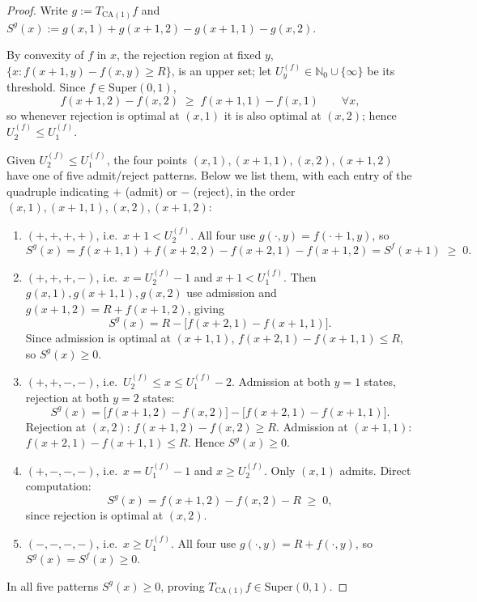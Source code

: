 \documentclass[11pt,a4paper]{article}
\newcommand{\N}{\mathbb{N}}
\newcommand{\Tca}{T_{\mathrm{CA}(1)}}
\theoremstyle{definition}
\begin{document}
\begin{proof}
Write $g := \Tca f$ and
$S^g(x) := g(x, 1) + g(x+1, 2) - g(x+1, 1) - g(x, 2)$.

By convexity of $f$ in $x$, the rejection region at fixed $y$,
$\{x : f(x+1, y) - f(x, y) \ge R\}$, is an upper set; let
$U_y^{(f)} \in \N_0 \cup \{\infty\}$ be its threshold. Since
$f \in \mathrm{Super}(0, 1)$,
\[
    f(x+1, 2) - f(x, 2) \;\ge\; f(x+1, 1) - f(x, 1) \qquad \forall x,
\]
so whenever rejection is optimal at $(x, 1)$ it is also optimal at
$(x, 2)$; hence $U_2^{(f)} \le U_1^{(f)}$.

Given $U_2^{(f)} \le U_1^{(f)}$, the four points
$(x, 1), (x+1, 1), (x, 2), (x+1, 2)$ have one of five
admit/reject patterns. Below we list them, with each entry of the
quadruple indicating $+$ (admit) or $-$ (reject), in the order
$(x, 1), (x+1, 1), (x, 2), (x+1, 2)$:

\begin{enumerate}[leftmargin=2em, itemsep=4pt]
\item \textbf{$(+, +, +, +)$}, i.e.\ $x + 1 < U_2^{(f)}$.
    All four use $g(\cdot, y) = f(\cdot + 1, y)$, so
    \[
        S^g(x) = f(x+1, 1) + f(x+2, 2) - f(x+2, 1) - f(x+1, 2)
              = S^f(x+1) \;\ge\; 0.
    \]

\item \textbf{$(+, +, +, -)$}, i.e.\ $x = U_2^{(f)} - 1$ and $x + 1 < U_1^{(f)}$.
    Then $g(x, 1), g(x+1, 1), g(x, 2)$ use admission and
    $g(x+1, 2) = R + f(x+1, 2)$, giving
    \[
        S^g(x) = R - \bigl[f(x+2, 1) - f(x+1, 1)\bigr].
    \]
    Since admission is optimal at $(x+1, 1)$,
    $f(x+2, 1) - f(x+1, 1) \le R$, so $S^g(x) \ge 0$.

\item \textbf{$(+, +, -, -)$}, i.e.\ $U_2^{(f)} \le x \le U_1^{(f)} - 2$.
    Admission at both $y = 1$ states, rejection at both $y = 2$
    states:
    \[
        S^g(x) = \bigl[f(x+1, 2) - f(x, 2)\bigr] - \bigl[f(x+2, 1) - f(x+1, 1)\bigr].
    \]
    Rejection at $(x, 2)$: $f(x+1, 2) - f(x, 2) \ge R$. Admission at
    $(x+1, 1)$: $f(x+2, 1) - f(x+1, 1) \le R$. Hence $S^g(x) \ge 0$.

\item \textbf{$(+, -, -, -)$}, i.e.\ $x = U_1^{(f)} - 1$ and $x \ge U_2^{(f)}$.
    Only $(x, 1)$ admits. Direct computation:
    \[
        S^g(x) = f(x+1, 2) - f(x, 2) - R \;\ge\; 0,
    \]
    since rejection is optimal at $(x, 2)$.

\item \textbf{$(-, -, -, -)$}, i.e.\ $x \ge U_1^{(f)}$.
    All four use $g(\cdot, y) = R + f(\cdot, y)$, so
    $S^g(x) = S^f(x) \ge 0$.
\end{enumerate}

In all five patterns $S^g(x) \ge 0$, proving $\Tca f \in \mathrm{Super}(0, 1)$.
\end{proof}
\end{document}
